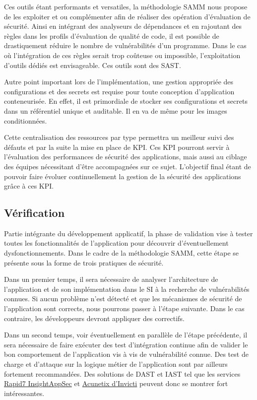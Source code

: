 Ces outils étant performants et versatiles, la méthodologie \ac{SAMM} nous propose de les exploiter et ou complémenter 
afin de réaliser des opération d'évaluation de sécurité.
\newline Ainsi en intégrant des analyseurs de dépendances et en rajoutant des règles dans les profils d'évaluation de 
qualité de code, il est possible de drastiquement réduire le nombre de vulnérabilités d'un programme.
Dans le cas où l'intégration de ces règles serait trop coûteuse ou impossible, l'exploitation d'outils dédiés est 
envisageable. Ces outils sont des \ac{SAST}. 

Autre point important lors de l'implémentation, une gestion appropriée des configurations et des secrets est requise pour
toute conception d'application conteneurisée. En effet, il est primordiale de stocker ses configurations et secrets dans
un référentiel unique et auditable. Il en va de même pour les images conditionnées.

Cette centralisation des ressources par type permettra un meilleur suivi des défauts et par la suite la mise en place 
de \ac{KPI}. Ces \ac{KPI} pourront servir à l'évaluation des performances de sécurité des applications, mais aussi au 
ciblage des équipes nécessitant d'être accompagnées sur ce sujet.
\newline L'objectif final étant de pouvoir faire évoluer continuellement la gestion de la sécurité des applications grâce
à ces \ac{KPI}.

\subsection{Vérification}
Partie intégrante du développement applicatif, la phase de validation vise à tester toutes les fonctionnalités de 
l'application pour découvrir d'éventuellement dysfonctionnements.
\newline Dans le cadre de la méthodologie \ac{SAMM}, cette étape se présente sous la forme de trois pratiques de sécurité.

Dans un premier temps, il sera nécessaire de analyser l'architecture de l'application et de son implémentation dans le 
\ac{SI} à la recherche de vulnérabilités connues. Si aucun problème n'est détecté et que les mécanismes de sécurité de 
l'application sont corrects, nous pourrons passer à l'étape suivante.
\newline Dans le cas contraire, les développeurs devront appliquer des correctifs.

Dans un second temps, voir éventuellement en parallèle de l'étape précédente, il sera nécessaire de faire exécuter des 
test d'intégration continue afin de valider le bon comportement de l'application vis à vis de vulnérabilité connue.
Des test de charge et d'attaque sur la logique métier de l'application sont par ailleurs fortement recommandées.
\newline Des solutions de \ac{DAST}  et \ac{IAST} tel que les services \href{https://www.rapid7.com/products/insightappsec/}
{Rapid7 InsightAppSec} et \href{https://www.acunetix.com/}{Acunetix d'Invicti} peuvent donc se montrer fort intéressantes.


